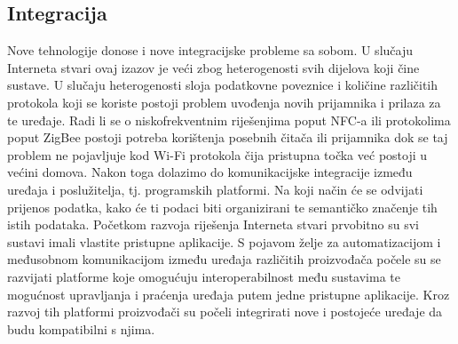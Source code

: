 \documentclass[times, utf8, diplomski]{fer}
\begin{document}
\subsection{Integracija}
Nove tehnologije donose i nove integracijske probleme sa sobom. U slučaju Interneta stvari ovaj izazov je veći zbog heterogenosti svih dijelova koji čine sustave. U slučaju heterogenosti sloja podatkovne poveznice i količine različitih protokola koji se koriste postoji problem uvođenja novih prijamnika i prilaza za te uređaje. Radi li se o niskofrekventnim riješenjima poput NFC-a ili protokolima poput ZigBee postoji potreba korištenja posebnih čitača ili prijamnika dok se taj problem ne pojavljuje kod Wi-Fi protokola čija pristupna točka već postoji u većini domova. Nakon toga dolazimo do komunikacijske integracije između uređaja i poslužitelja, tj. programskih platformi. Na koji način će se odvijati prijenos podatka, kako će ti podaci biti organizirani te semantičko značenje tih istih podataka. Početkom razvoja riješenja Interneta stvari prvobitno su svi sustavi imali vlastite pristupne aplikacije. S pojavom želje za automatizacijom i međusobnom komunikacijom između uređaja različitih proizvođača počele su se razvijati platforme koje omogućuju interoperabilnost među sustavima te mogućnost upravljanja i praćenja uređaja putem jedne pristupne aplikacije. Kroz razvoj tih platformi proizvođači su počeli integrirati nove i postojeće uređaje da budu kompatibilni s njima.
\end{document}
